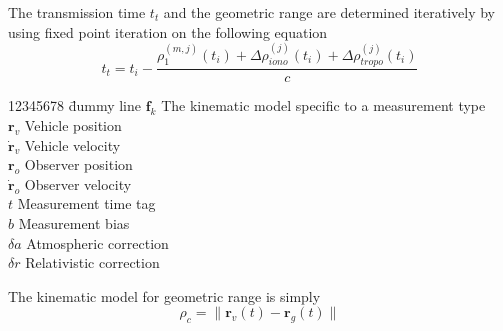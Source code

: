 The transmission time $t_t$ and the geometric range are determined
iteratively by using fixed point iteration on the following equation
%
\begin{equation}
   t_t = t_i - \frac{\rho^{(m,j)}_1(t_i) + \Delta \rho^{(j)}_{iono}(t_i) + \Delta \rho^{(j)}_{tropo}(t_i)}{c}
\end{equation}




%
\begin{tabbing}[htbp!]
12345678 \= dummy line \kill
$\mathbf{f}_k$ \> The kinematic model specific to a measurement type\\
$\mathbf{r}_v$ \> Vehicle position\\
$\dot{\mathbf{r}}_v$ \> Vehicle velocity\\
$\mathbf{r}_o$ \> Observer position\\
$\dot{\mathbf{r}}_o$    \> Observer velocity\\
$t$    \> Measurement time tag\\
$b$    \> Measurement bias\\
$\delta a$    \> Atmospheric correction\\
$\delta r$     \> Relativistic correction\\
\end{tabbing}

The kinematic model for geometric range is simply
%
\begin{equation}
    \rho_c = \| \mathbf{r}_v(t) - \mathbf{r}_g(t)\|
\end{equation}
%

